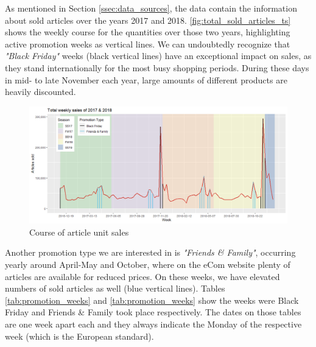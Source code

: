 


As mentioned in Section \ref{ssec:data_sources}, the data contain the information about sold articles over the years 2017 and 2018. \autoref{fig:total_sold_articles_ts} shows the weekly course for the quantities over those two years, highlighting active promotion weeks as vertical lines. We can undoubtedly recognize that \textit{"Black Friday"} weeks (black vertical lines) have an exceptional impact on sales, as they stand internationally for the most busy shopping periods. During these days in mid- to late November each year, large amounts of different products are heavily discounted.
\\

\begin{figure}[H]
\centering
  \includegraphics[width=1\linewidth]{figures/total_sold_articles_ts.png}
  \caption{Course of article unit sales}
  \label{fig:total_sold_articles_ts}
\end{figure}

Another promotion type we are interested in is \textit{"Friends \& Family"}, occurring yearly around April-May and October, where on the eCom website plenty of articles are available for reduced prices. On these weeks, we have elevated numbers of sold articles as well (blue vertical lines). Tables \ref{tab:promotion_weeks} and \ref{tab:promotion_weeks} show the weeks were Black Friday and Friends \& Family took place respectively. The dates on those tables are one week apart each and they always indicate the Monday of the respective week (which is the European standard).
\\



